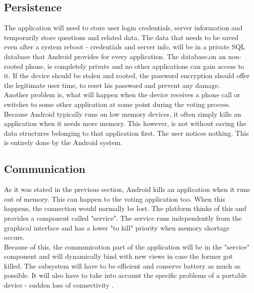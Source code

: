 \documentclass[11pt,twoside,a4paper]{book}
\begin{document}
\subsection{Persistence}
The application will need to store user login credentials, server information and temporarily store questions and related data. The data that needs to be saved even after a system reboot - credentials and server info, will be in a private SQL database that Android provides for every application. The database,on an non-rooted\cite{whatIsRoot}  phone,  is completely private and no other applications can gain access to it. If the device should be stolen and rooted, the password encryption should offer the legitimate user time, to reset his password and prevent any damage. \\
Another problem is, what will happen when the device receives a phone call or switches to some other application \cite{bakalarkaJV} at some point during the voting process. Because Android typically runs on low memory devices, it often simply kills an application when it needs more memory. This however, is not without saving the data structures belonging to that application first. The user notices nothing. This is entirely done by the Android system.\\

\subsection{Communication}

As it was stated in the previous section, Android kills an application when it runs out of memory. This can happen to the voting application too. When this happens, the connection would normally be lost. The platform thinks of this and provides a component called "service". The service runs independently from the graphical interface and has a lower "to kill" priority when memory shortage occurs. \\

Because of this, the communication part of the application will be in the "service" component and will dynamically bind with new views in case the former got killed. The subsystem will have to be efficient and conserve battery as much as possible. It will also have to take into account the specific problems of a portable device - sudden loss of connectivity \cite{bakalarkaJV}. 




	
\end{document}

